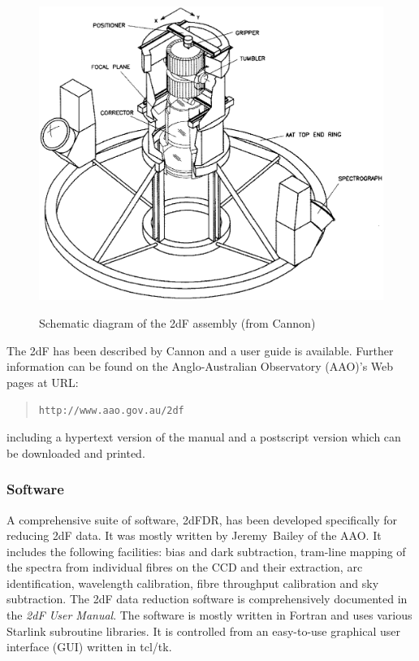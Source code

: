 \documentclass[twoside,11pt]{article}
\newcommand{\htmladdnormallink}[2]{#1}
\begin{document}
\begin{figure}[htbp]
   \centering
   \includegraphics[totalheight=6in]{sc14_2df.ps}
   \begin{quote}
   \caption[Schematic diagram of the 2dF assembly]{Schematic diagram of
    the 2dF assembly (from Cannon\cite{CANNON97})
   \label{2DF_SCHEMATIC} }
   \end{quote}
\end{figure}

The 2dF has been described by Cannon\cite{CANNON97} and a user
guide is available\cite{BAILEY97}.  Further information can be found
on the Anglo-Australian Observatory (AAO)'s Web pages at URL:

\begin{quote}
\htmladdnormallink{ {\tt http://www.aao.gov.au/2df} }
  {http://www.aao.gov.au/2df}
\end{quote}

including a hypertext version of the manual and a postscript version
which can be downloaded and printed.

\subsubsection{\label{2DF_S}Software}

A comprehensive suite of software, 2dFDR, has been developed specifically
for reducing 2dF data.  It was mostly written by Jeremy~Bailey of the
AAO.  It includes the following facilities: bias and dark subtraction,
tram-line mapping of the spectra from individual fibres on the CCD and
their extraction, arc identification, wavelength calibration, fibre
throughput calibration and sky subtraction.  The 2dF data reduction
software is comprehensively documented in the 
\htmladdnormallink{ {\it 2dF User Manual}\/}
{http://www.aao.gov.au/2df/manual.html}\cite{BAILEY97}.
The software is mostly written in Fortran and uses various Starlink
subroutine libraries.  It is controlled from an easy-to-use graphical
user interface (GUI) written in tcl/tk.
\end{document}
